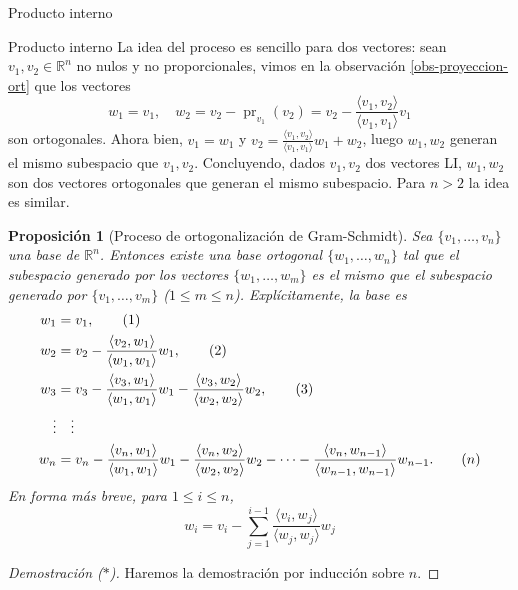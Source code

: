 \documentclass[a4paper,12pt,twoside,spanish,reqno]{amsbook}
\numberwithin{equation}{section}
\newtheorem{proposicion}[teorema]{Proposici\'on}
\theoremstyle{definition}
\theoremstyle{remark}
\newcommand{\la}{\langle}
\newcommand{\ra}{\rangle}
\newcommand{\R}{\mathbb R}
\begin{document}
\begin{chapter}{Producto interno}
\begin{section}{Producto interno}
        La idea del proceso es sencillo para dos vectores: sean  $v_1,v_2 \in \R^n$ no  nulos y no proporcionales, vimos en la observación \ref{obs-proyeccion-ort} que  los vectores
        \begin{equation*}
            w_1 = v_1, \quad w_2 = v_2 - \operatorname{pr}_{v_1}(v_2) = v_2 - \frac{\la v_1,v_2\ra}{\la v_1,v_1\ra}v_1
        \end{equation*}
        son ortogonales. Ahora bien, $v_1 = w_1$ y $v_2  = \frac{\la v_1,v_2\ra}{\la v_1,v_1\ra}w_1 + w_2$, luego  $w_1,w_2$ generan el mismo subespacio que $v_1,v_2$. Concluyendo, dados  $v_1,v_2$ dos vectores LI, $w_1,w_2$ son dos vectores ortogonales que generan el mismo subespacio. Para $n >2$ la idea es similar. 
        
        \medskip 
        
        
        
        \begin{proposicion}[Proceso de ortogonalización de Gram-Schmidt]
            Sea $\{v_1,\ldots,v_n\}$ una base de $\R^n$. Entonces existe una base ortogonal $\{w_1,\ldots, w_n\}$ tal que el subespacio generado por los vectores $\{w_1,\ldots, w_m\}$ es el mismo que el subespacio generado por $\{v_1,\ldots, v_m\}$ ($1\le m \le n$). Explícitamente, la base es
            \begin{align}
            w_1 &= v_1, \tag{1} \\
            w_2 &= v_2 - \frac{\la v_2,w_1\ra}{\la w_1,w_1\ra}w_1, \tag{2}\\
            w_3 &= v_3 - \frac{\la v_3,w_1\ra}{\la w_1,w_1\ra}w_1- \frac{\la v_3,w_2\ra}{\la w_2,w_2\ra}w_2,\tag{3} \\
            \vdots &\quad \vdots \notag \\
            w_n &= v_n - \frac{\la v_n,w_1\ra}{\la w_1,w_1\ra}w_1- \frac{\la v_n,w_2\ra}{\la w_2,w_2\ra}w_2 - \cdots - \frac{\la v_n,w_{n-1}\ra}{\la w_{n-1},w_{n-1}\ra}w_{n-1}.\tag{$n$}	
            \end{align}
            En forma más breve, para $1 \le i \le n$, 
            \begin{equation}
            w_i = v_i - \sum_{j = 1}^{i-1} \frac{\la v_i,w_{j}\ra}{\la w_{j},w_{j}\ra}w_{j} \tag{$i$}
            \end{equation}
        \end{proposicion} 
        \begin{proof}[Demostración ($*$)]
            
            
            Haremos la demostración por inducción sobre $n$. 
            

\end{proof}
\end{section}
\end{chapter}
\end{document}
